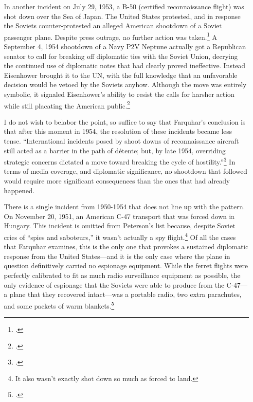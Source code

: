 \documentclass{report}
\begin{document}
\begin{refsegment}
In another incident on July 29, 1953, a B-50 (certified reconnaissance flight) was shot down over the Sea of Japan. The United States protested, and in response the Soviets counter-protested an alleged American shootdown of a Soviet passenger plane. Despite press outrage, no further action was taken.\footcite[p.~47]{farquhar_aerial_2015} A September 4, 1954 shootdown of a Navy P2V Neptune actually got a Republican senator to call for breaking off diplomatic ties with the Soviet Union, decrying the continued use of diplomatic notes that had clearly proved ineffective. Instead Eisenhower brought it to the UN, with the full knowledge that an unfavorable decision would be vetoed by the Soviets anyhow. Although the move was entirely symbolic, it signaled Eisenhower's ability to resist the calls for harsher action while still placating the American public.\footcite[p.~47]{farquhar_aerial_2015}

I do not wish to belabor the point, so suffice to say that Farquhar's conclusion is that after this moment in 1954, the resolution of these incidents became less tense. ``International incidents posed by shoot downs of reconnaissance aircraft still acted as a barrier in the path of d\'etente; but, by late 1954, overriding strategic concerns dictated a move toward breaking the cycle of hostility.''\footcite[p.~49]{farquhar_aerial_2015} In terms of media coverage, and diplomatic significance, no shootdown that followed would require more significant consequences than the ones that had already happened.

There is a single incident from 1950-1954 that does not line up with the pattern. On November 20, 1951, an American C-47 transport that was forced down in Hungary. This incident is omitted from Peterson's list because, despite Soviet cries of ``spies and saboteurs,'' it wasn't actually a spy flight.\footnote{It also wasn't exactly shot down so much as forced to land.} Of all the cases that Farquhar examines, this is the only one that provokes a sustained diplomatic response from the United States---and it is the only case where the plane in question definitively carried no espionage equipment. While the ferret flights were perfectly calibrated to fit as much radio surveillance equipment as possible, the only evidence of espionage that the Soviets were able to produce from the C-47---a plane that they recovered intact---was a portable radio, two extra parachutes, and some packets of warm blankets.\footcite{the_united_press_soviet_1951}


\end{refsegment}
\end{document}
